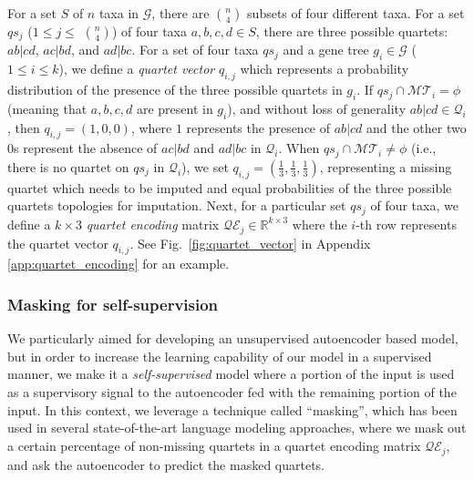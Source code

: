 For a set $S$ of $n$ taxa in $\mathcal{G}$, there are $n \choose 4$ subsets of four different taxa. For a set $qs_j$ ($1\le j \le$ $n \choose 4$) of four taxa $a,b,c,d \in S$, there are three possible quartets: $ab|cd$, $ac|bd$, and $ad|bc$. For a set of four taxa $qs_j$ and a gene tree $g_i \in \mathcal{G}$ ($1 \le i \le k$), we define a \textit{quartet vector} $q_{i,j}$ which represents a probability distribution of the presence of the three possible quartets in $g_i$. If $qs_j \cap \mathcal{MT}_i = \phi$ (meaning that $a,b,c,d$ are present in $g_i$), and without loss of generality $ab|cd \in \mathcal{Q}_i$, then $q_{i,j} = (1,0,0)$, where $1$ represents the presence of $ab|cd$ and the other two $0$s represent the absence of $ac|bd$ and $ad|bc$ in $\mathcal{Q}_i$. When $qs_j \cap \mathcal{MT}_i \ne \phi$ (i.e., there is no quartet on $qs_j$ in $\mathcal{Q}_i$), we set $q_{i,j} = (\frac{1}{3},\frac{1}{3},\frac{1}{3})$, representing a missing quartet which needs to be imputed and equal probabilities of the three possible quartets topologies for imputation. Next, for a particular set $qs_j$ of four taxa, we define a $k \times 3$ \textit{quartet encoding} matrix $\mathcal{QE}_j \in \mathbb{R}^{k \times 3}$ where the $i$-th row represents the quartet vector $q_{i,j}$. See Fig.~\ref{fig:quartet_vector} in Appendix \ref{app:quartet_encoding} for an example.


\subsubsection{Masking for self-supervision}
\label{sec:masking}

We particularly aimed for developing an unsupervised autoencoder based model, but in order to increase the learning capability of our model in a supervised manner, we make it a \textit{self-supervised} model where a portion of the input is used as a supervisory signal to the autoencoder fed with the remaining portion of the input. In this context, we leverage a technique called ``masking'', which has been used in several state-of-the-art language modeling approaches, where we mask out a certain percentage of non-missing quartets in a quartet encoding matrix $\mathcal{QE}_j$, and ask the autoencoder to predict the masked quartets. 

